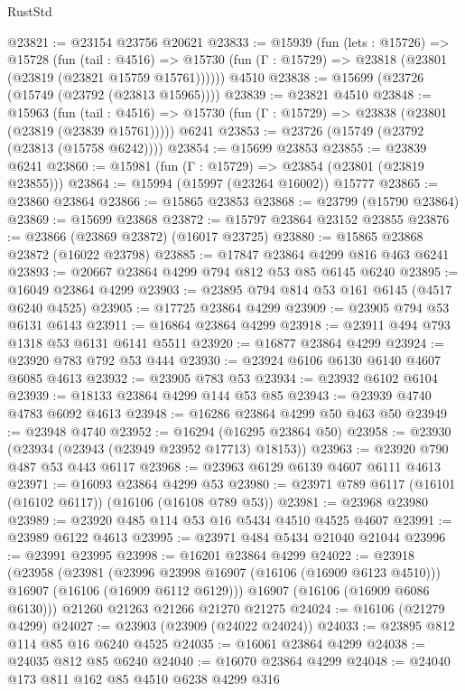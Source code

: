 \begin{lexlean}{RustStd}
\begin{coremodule}
@23821 := @23154 @23756 @20621
@23833 := @15939
    (fun (lets : @15726) =>
    @15728
      (fun (tail : @4516) =>
      @15730 (fun (Γ : @15729) => @23818 (@23801 (@23819 (@23821 @15759 @15761))))))
    @4510
@23838 := @15699 (@23726 (@15749 (@23792 (@23813 @15965))))
@23839 := @23821 @4510
@23848 := @15963
    (fun (tail : @4516) => @15730 (fun (Γ : @15729) => @23838 (@23801 (@23819 (@23839 @15761)))))
    @6241
@23853 := @23726 (@15749 (@23792 (@23813 (@15758 @6242))))
@23854 := @15699 @23853
@23855 := @23839 @6241
@23860 := @15981 (fun (Γ : @15729) => @23854 (@23801 (@23819 @23855)))
@23864 := @15994 (@15997 (@23264 @16002)) @15777
@23865 := @23860 @23864
@23866 := @15865 @23853
@23868 := @23799 (@15790 @23864)
@23869 := @15699 @23868
@23872 := @15797 @23864 @23152 @23855
@23876 := @23866 (@23869 @23872) (@16017 @23725)
@23880 := @15865 @23868 @23872 (@16022 @23798)
@23885 := @17847 @23864 @4299 @816 @463 @6241
@23893 := @20667 @23864 @4299 @794 @812 @53 @85 @6145 @6240
@23895 := @16049 @23864 @4299
@23903 := @23895 @794 @814 @53 @161 @6145 (@4517 @6240 @4525)
@23905 := @17725 @23864 @4299
@23909 := @23905 @794 @53 @6131 @6143
@23911 := @16864 @23864 @4299
@23918 := @23911 @494 @793 @1318 @53 @6131 @6141 @5511
@23920 := @16877 @23864 @4299
@23924 := @23920 @783 @792 @53 @444
@23930 := @23924 @6106 @6130 @6140 @4607 @6085 @4613
@23932 := @23905 @783 @53
@23934 := @23932 @6102 @6104
@23939 := @18133 @23864 @4299 @144 @53 @85
@23943 := @23939 @4740 @4783 @6092 @4613
@23948 := @16286 @23864 @4299 @50 @463 @50
@23949 := @23948 @4740
@23952 := @16294 (@16295 @23864 @50)
@23958 := @23930 (@23934 (@23943 (@23949 @23952 @17713) @18153))
@23963 := @23920 @790 @487 @53 @443 @6117
@23968 := @23963 @6129 @6139 @4607 @6111 @4613
@23971 := @16093 @23864 @4299 @53
@23980 := @23971 @789 @6117 (@16101 (@16102 @6117)) (@16106 (@16108 @789 @53))
@23981 := @23968 @23980
@23989 := @23920 @485 @114 @53 @16 @5434 @4510 @4525 @4607
@23991 := @23989 @6122 @4613
@23995 := @23971 @484 @5434 @21040 @21044
@23996 := @23991 @23995
@23998 := @16201 @23864 @4299
@24022 := @23918
    (@23958
      (@23981
        (@23996 @23998 @16907 (@16106 (@16909 @6123 @4510)))
        @16907
        (@16106 (@16909 @6112 @6129)))
      @16907
      (@16106 (@16909 @6086 @6130)))
    @21260
    @21263
    @21266
    @21270
    @21275
@24024 := @16106 (@21279 @4299)
@24027 := @23903 (@23909 (@24022 @24024))
@24033 := @23895 @812 @114 @85 @16 @6240 @4525
@24035 := @16061 @23864 @4299
@24038 := @24035 @812 @85 @6240
@24040 := @16070 @23864 @4299
@24048 := @24040 @173 @811 @162 @85 @4510 @6238 @4299 @316

\end{coremodule}
\end{lexlean}
